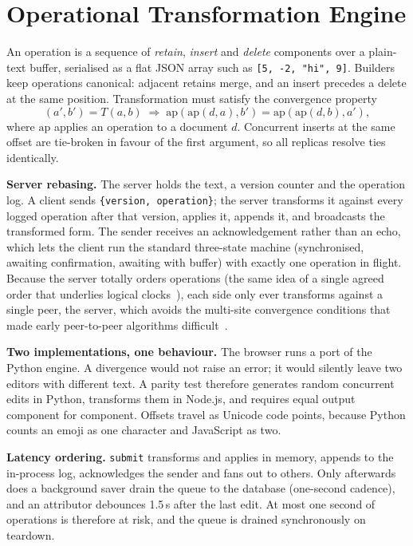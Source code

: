 \documentclass[conference]{IEEEtran}
\begin{document}
\section{Operational Transformation Engine}
An operation is a sequence of \emph{retain}, \emph{insert} and \emph{delete} components over a plain-text buffer, serialised as a flat JSON array such as \texttt{[5, -2, "hi", 9]}. Builders keep operations canonical: adjacent retains merge, and an insert precedes a delete at the same position. Transformation must satisfy the convergence property
\begin{equation}
(a',b')=T(a,b)\;\Rightarrow\;
\mathrm{ap}(\mathrm{ap}(d,a),b')=\mathrm{ap}(\mathrm{ap}(d,b),a'),
\label{eq:tp1}
\end{equation}
where $\mathrm{ap}$ applies an operation to a document $d$. Concurrent inserts at the same offset are tie-broken in favour of the first argument, so all replicas resolve ties identically.

\textbf{Server rebasing.} The server holds the text, a version counter and the operation log. A client sends \texttt{\{version, operation\}}; the server transforms it against every logged operation after that version, applies it, appends it, and broadcasts the transformed form. The sender receives an acknowledgement rather than an echo, which lets the client run the standard three-state machine (synchronised, awaiting confirmation, awaiting with buffer) with exactly one operation in flight. Because the server totally orders operations (the same idea of a single agreed order that underlies logical clocks~\cite{lamport1978}), each side only ever transforms against a single peer, the server, which avoids the multi-site convergence conditions that made early peer-to-peer algorithms difficult~\cite{oster2006}.

\textbf{Two implementations, one behaviour.} The browser runs a port of the Python engine. A divergence would not raise an error; it would silently leave two editors with different text. A parity test therefore generates random concurrent edits in Python, transforms them in Node.js, and requires equal output component for component. Offsets travel as Unicode code points, because Python counts an emoji as one character and JavaScript as two.

\textbf{Latency ordering.} \texttt{submit} transforms and applies in memory, appends to the in-process log, acknowledges the sender and fans out to others. Only afterwards does a background saver drain the queue to the database (one-second cadence), and an attributor debounces 1.5\,s after the last edit. At most one second of operations is therefore at risk, and the queue is drained synchronously on teardown.
\end{document}
